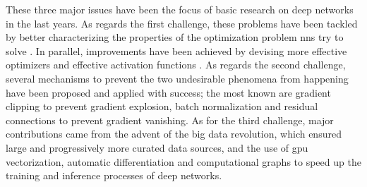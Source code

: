 These three major issues have been the focus of basic research on deep networks in the last years. As regards the first challenge, these problems have been tackled by better characterizing the properties of the optimization problem \glspl{nn} try to solve \citep{goodfellow2015optimization,janocha2017lossfunction}. In parallel, improvements have been achieved by devising more effective optimizers \citep{kingma2015adam,ruder2016overviewsgd} and effective activation functions \citep{glorot2011relu}. As regards the second challenge, several mechanisms to prevent the two undesirable phenomena from happening have been proposed and applied with success; the most known are gradient clipping \citep{zhang2020gradientclipping} to prevent gradient explosion, batch normalization \citep{ioffe2015batchnorm} and residual connections \citep{he2016resnets} to prevent gradient vanishing. As for the third challenge, major contributions came from the advent of the big data revolution, which ensured large and progressively more curated data sources, and the use of \gls{gpu} vectorization, automatic differentiation and computational graphs \citep{abadi2016tensorflow,paszke2017pytorch} to speed up the training and inference processes of deep networks.


